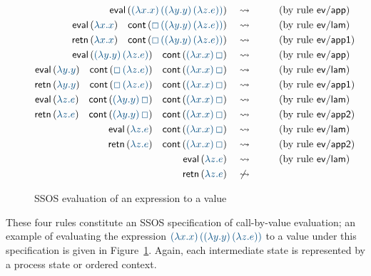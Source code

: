 \begin{figure}
\begin{align*}
{\sf eval}\,(\obj{(\lambda x.x)\,((\lambda y.y)\,(\lambda z.e))}) 
& ~~~\rightsquigarrow~~ \tag{by rule ${\sf ev/app}$}\\
{\sf eval}\,(\obj{\lambda x.x}) \quad
{\sf cont}\,(\obj{\Box\,((\lambda y.y)\,(\lambda z.e))})
& ~~~\rightsquigarrow~~ \tag{by rule ${\sf ev/lam}$}\\
{\sf retn}\,(\obj{\lambda x.x}) \quad
{\sf cont}\,(\obj{\Box\,((\lambda y.y)\,(\lambda z.e))})
& ~~~\rightsquigarrow~~ \tag{by rule ${\sf ev/app1}$}\\
{\sf eval}\,(\obj{(\lambda y.y)\,(\lambda z.e)}) \quad
{\sf cont}\,(\obj{(\lambda x.x)\,\Box})
& ~~~\rightsquigarrow~~ \tag{by rule ${\sf ev/app}$}\\
{\sf eval}\,(\obj{\lambda y.y}) \quad
{\sf cont}\,(\obj{\Box\,(\lambda z.e)}) \quad
{\sf cont}\,(\obj{(\lambda x.x)\,\Box})
& ~~~\rightsquigarrow~~ \tag{by rule ${\sf ev/lam}$}\\
{\sf retn}\,(\obj{\lambda y.y}) \quad
{\sf cont}\,(\obj{\Box\,(\lambda z.e)}) \quad
{\sf cont}\,(\obj{(\lambda x.x)\,\Box})
& ~~~\rightsquigarrow~~ \tag{by rule ${\sf ev/app1}$}\\
{\sf eval}\,(\obj{\lambda z.e}) \quad
{\sf cont}\,(\obj{(\lambda y.y)\,\Box}) \quad
{\sf cont}\,(\obj{(\lambda x.x)\,\Box})
& ~~~\rightsquigarrow~~ \tag{by rule ${\sf ev/lam}$}\\
{\sf retn}\,(\obj{\lambda z.e}) \quad
{\sf cont}\,(\obj{(\lambda y.y)\,\Box}) \quad
{\sf cont}\,(\obj{(\lambda x.x)\,\Box})
& ~~~\rightsquigarrow~~ \tag{by rule ${\sf ev/app2}$}\\
{\sf eval}\,(\obj{\lambda z.e}) \quad
{\sf cont}\,(\obj{(\lambda x.x)\,\Box})
& ~~~\rightsquigarrow~~ \tag{by rule ${\sf ev/lam}$}\\
{\sf retn}\,(\obj{\lambda z.e}) \quad
{\sf cont}\,(\obj{(\lambda x.x)\,\Box})
& ~~~\rightsquigarrow~~ \tag{by rule ${\sf ev/app2}$}\\
{\sf eval}\,(\obj{\lambda z.e}) 
& ~~~\rightsquigarrow~~ \tag{by rule ${\sf ev/lam}$}\\
{\sf retn}\,(\obj{\lambda z.e}) 
& ~~~\not\rightsquigarrow~~ 
\end{align*}
\caption{SSOS evaluation of an expression to a value}
\label{fig:ssos-example}
\end{figure}

These four rules constitute an SSOS specification of call-by-value
evaluation; an example of evaluating the expression $\obj{(\lambda
x.x)\,((\lambda y.y)\,(\lambda z.e))}$ to a value under this
specification is given in Figure~\ref{fig:ssos-example}.  Again, each
intermediate state is represented by a process state or ordered
context.

